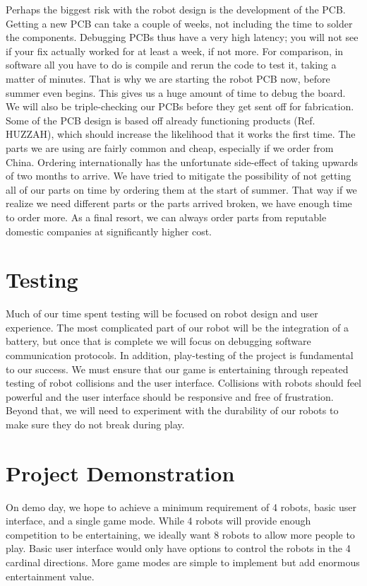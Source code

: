 \documentclass[11pt]{ieeeconf}
\begin{document}
Perhaps the biggest risk with the robot design is the development of the PCB. Getting a new PCB can take a couple of weeks, not including the time to solder the components. Debugging PCBs thus have a very high latency; you will not see if your fix actually worked for at least a week, if not more. For comparison, in software all you have to do is compile and rerun the code to test it, taking a matter of minutes. That is why we are starting the robot PCB now, before summer even begins. This gives us a huge amount of time to debug the board. We will also be triple-checking our PCBs before they get sent off for fabrication. Some of the PCB design is based off already functioning products (Ref. HUZZAH), which should increase the likelihood that it works the first time. The parts we are using are fairly common and cheap, especially if we order from China. Ordering internationally has the unfortunate side-effect of taking upwards of two months to arrive. We have tried to mitigate the possibility of not getting all of our parts on time by ordering them at the start of summer. That way if we realize we need different parts or the parts arrived broken, we have enough time to order more. As a final resort, we can always order parts from reputable domestic companies at significantly higher cost.

\section{Testing}
Much of our time spent testing will be focused on robot design and user experience. The most complicated part of our robot will be the integration of a battery, but once that is complete we will focus on debugging software communication protocols. In addition, play-testing of the project is fundamental to our success. We must ensure that our game is entertaining through repeated testing of robot collisions and the user interface. Collisions with robots should feel powerful and the user interface should be responsive and free of frustration. Beyond that, we will need to experiment with the durability of our robots to make sure they do not break during play.

\section{Project Demonstration}

On demo day, we hope to achieve a minimum requirement of 4 robots, basic user interface, and a single game mode. While 4 robots will provide enough competition to be entertaining, we ideally want 8 robots to allow more people to play. Basic user interface would only have options to control the robots in the 4 cardinal directions. More game modes are simple to implement but add enormous entertainment value.
\end{document}
